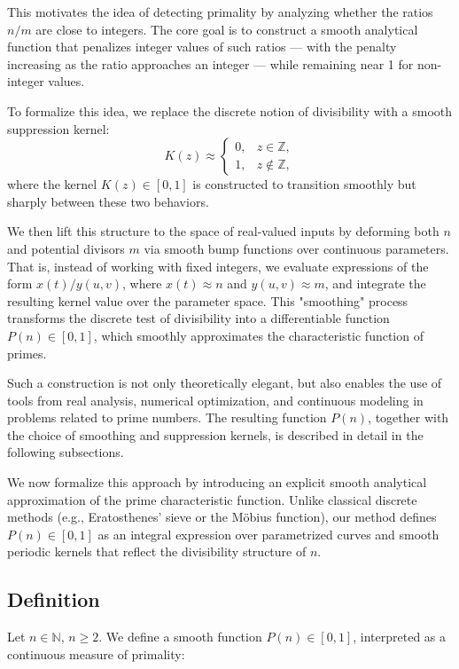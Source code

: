 \documentclass[12pt]{article}
\theoremstyle{definition}
\theoremstyle{plain}
\theoremstyle{remark}
\begin{document}
This motivates the idea of detecting primality by analyzing whether the ratios \( n/m \) are close to integers. The core goal is to construct a smooth analytical function that penalizes integer values of such ratios — with the penalty increasing as the ratio approaches an integer — while remaining near 1 for non-integer values.

To formalize this idea, we replace the discrete notion of divisibility with a smooth suppression kernel:
\[
K(z) \approx
\begin{cases}
0, & z \in \mathbb{Z}, \\
1, & z \notin \mathbb{Z},
\end{cases}
\]
where the kernel \( K(z) \in [0,1] \) is constructed to transition smoothly but sharply between these two behaviors.

We then lift this structure to the space of real-valued inputs by deforming both \( n \) and potential divisors \( m \) via smooth bump functions over continuous parameters. That is, instead of working with fixed integers, we evaluate expressions of the form \( x(t)/y(u,v) \), where \( x(t) \approx n \) and \( y(u,v) \approx m \), and integrate the resulting kernel value over the parameter space. This "smoothing" process transforms the discrete test of divisibility into a differentiable function \( P(n) \in [0,1] \), which smoothly approximates the characteristic function of primes.

Such a construction is not only theoretically elegant, but also enables the use of tools from real analysis, numerical optimization, and continuous modeling in problems related to prime numbers. The resulting function \( P(n) \), together with the choice of smoothing and suppression kernels, is described in detail in the following subsections.

We now formalize this approach by introducing an explicit smooth analytical approximation of the prime characteristic function. Unlike classical discrete methods (e.g., Eratosthenes' sieve or the Möbius function), our method defines \( P(n) \in [0,1] \) as an integral expression over parametrized curves and smooth periodic kernels that reflect the divisibility structure of \( n \).

\subsection{Definition}

Let \( n \in \mathbb{N} \), \( n \geq 2 \). We define a smooth function \( P(n) \in [0,1] \), interpreted as a continuous measure of primality:
\end{document}
